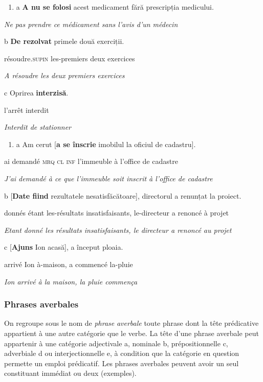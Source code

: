 \begin{enumerate}
\item \label{bkm:Ref302561879}a  \textbf{A nu se folosi} acest medicament fără prescripția medicului. 


\end{enumerate}
{\itshape
Ne pas prendre ce médicament sans l'avis d'un médecin}

b  \textbf{De rezolvat} primele două exerciții.  

  résoudre.\textsc{supin} les-premiers deux exercices 

{\itshape
A résoudre les deux premiers exercices}

c  Oprirea \textbf{interzisă}.  

  l'arrêt interdit 

{\itshape
Interdit de stationner}


\begin{enumerate}
\item \label{bkm:Ref302561915}a  Am  cerut  [\textbf{a  se  înscrie}  imobilul  la  oficiul  de  cadastru]. 


\end{enumerate}
ai  demandé  \textsc{mrq  cl  inf}  l'immeuble  à  l'office  de  cadastre

{\itshape
J'ai demandé à ce que l'immeuble soit inscrit à l'office de cadastre}

b  [\textbf{Date  fiind}  rezultatele  nesatisfăcătoare],  directorul  a  renunțat  la  proiect. 

donnés  étant  les-résultats  insatisfaisants,  le-directeur  a  renoncé  à  projet

  \textit{Etant donné les résultats insatisfaisants, le directeur a renoncé au projet} 

c  [\textbf{Ajuns}  Ion  acasă],  a  început  ploaia. 

arrivé  Ion  à-maison,  a  commencé  la-pluie

  \textit{Ion arrivé à la maison, la pluie commença}

\subsubsection{Phrases averbales} 
On regroupe sous le nom de \textit{phrase} \textit{averbale} toute phrase dont la tête prédicative appartient à une autre catégorie que le verbe. La tête d'une phrase averbale peut appartenir à une catégorie adjectivale a, nominale b, prépositionnelle c, adverbiale d ou interjectionnelle e, à condition que la catégorie en question permette un emploi prédicatif. Les phrases averbales peuvent avoir un seul constituant immédiat ou deux (exemples).


